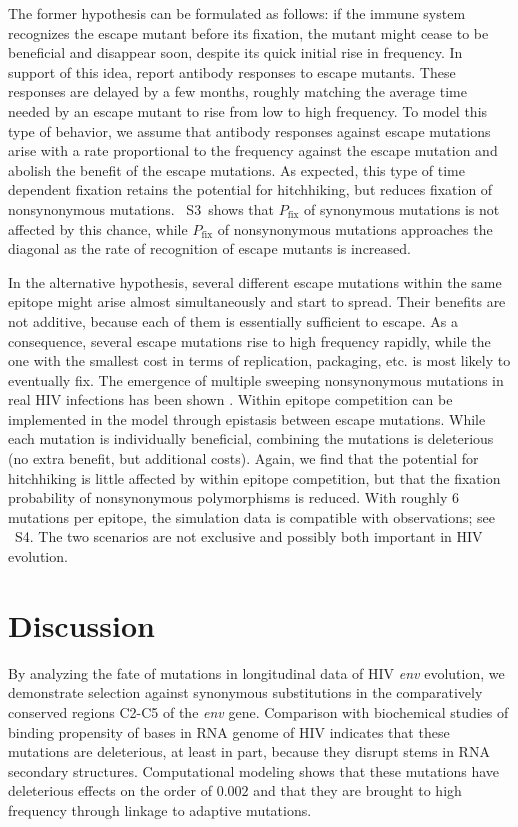 \documentclass[rmp, twocolumn]{revtex4}
\newcommand{\pfix}{P_{\mathrm{fix}}}
\newcommand{\env}{\textit{env}}
\newcommand{\timedependence}{3}
\newcommand{\withinepi}{4}
\begin{document}
The former hypothesis can be formulated as follows: if the immune system
recognizes the escape mutant before its fixation, the mutant might cease to be
beneficial and disappear soon, despite its quick initial rise in frequency. In
support of this idea, \citet{richman_rapid_2003, bunnik_autologous_2008} report
antibody responses to escape mutants. These responses are delayed by a few
months, roughly matching the average time needed by an escape mutant to rise
from low to high frequency. To model this type of behavior, we assume that
antibody responses against escape mutations arise with a rate proportional to
the frequency against the escape mutation and abolish the benefit of the escape
mutations. As expected, this type of time dependent fixation retains the
potential for hitchhiking, but reduces fixation of nonsynonymous mutations.
\figurename~S\timedependence~shows that $\pfix$ of synonymous mutations is not
affected by this chance, while $\pfix$ of nonsynonymous mutations approaches
the diagonal as the rate of recognition of escape mutants is increased. 

In the alternative hypothesis, several different escape mutations within the
same epitope might arise almost simultaneously and start to spread. Their
benefits are not additive, because each of them is essentially sufficient to
escape. As a consequence, several escape mutations rise to high frequency
rapidly, while the one with the smallest cost in terms of replication,
packaging, etc. is most likely to eventually fix. The emergence of multiple
sweeping nonsynonymous mutations in real HIV infections has been shown
\citep{moore_limited_2009, bar_early_2012}. Within epitope competition can be
implemented in the model through epistasis between escape mutations. While each
mutation is individually beneficial, combining the mutations is deleterious (no
extra benefit, but additional costs). Again, we find that the potential for
hitchhiking is little affected by within epitope competition, but that the
fixation probability of nonsynonymous polymorphisms is reduced. With roughly 6
mutations per epitope, the simulation data is compatible with observations; see
\figurename~S\withinepi. The two scenarios are not exclusive and possibly both
important in HIV evolution.

\section{Discussion}
By analyzing the fate of mutations in longitudinal data of HIV \env{} evolution,
we demonstrate selection against synonymous substitutions in the comparatively
conserved regions C2-C5 of the \env{} gene. Comparison with biochemical studies
of binding propensity of bases in RNA genome of HIV indicates that these
mutations are deleterious, at least in part, because they disrupt stems in RNA
secondary structures. Computational modeling shows that these mutations have
deleterious effects on the order of $0.002$ and that they are brought to high
frequency through linkage to adaptive mutations.
\end{document}
